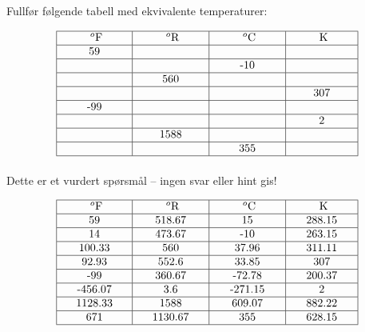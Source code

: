 

Fullfør følgende tabell med ekvivalente temperaturer:


$$\vbox{\offinterlineskip
\halign{\strut
\vrule \quad\hfil # \ \hfil & 
\vrule \quad\hfil # \ \hfil & 
\vrule \quad\hfil # \ \hfil & 
\vrule \quad\hfil # \ \hfil \vrule \cr
\noalign{\hrule}
%
\hskip 20pt $^{o}$F \hskip 20pt & \hskip 20pt $^{o}$R \hskip 20pt & \hskip 20pt $^{o}$C \hskip 20pt & \hskip 20pt K \hskip 20pt \cr
%
\noalign{\hrule}
%
59 &  &  &  \cr
%
\noalign{\hrule}
%
  &  & -10 &  \cr
%
\noalign{\hrule}
%
  & 560 &  &  \cr
%
\noalign{\hrule}
%
  &  &  & 307 \cr
%
\noalign{\hrule}
%
-99  &  &  &  \cr
%
\noalign{\hrule}
%
  &  &  & 2 \cr
%
\noalign{\hrule}
%
  & 1588 &  &  \cr
%
\noalign{\hrule}
%
  &  & 355 &  \cr
%
\noalign{\hrule}
} %
}$$ %

\vfil 

\eject






Dette er et vurdert spørsmål -- ingen svar eller hint gis!








$$\vbox{\offinterlineskip
\halign{\strut
\vrule \quad\hfil # \ \hfil & 
\vrule \quad\hfil # \ \hfil & 
\vrule \quad\hfil # \ \hfil & 
\vrule \quad\hfil # \ \hfil \vrule \cr
\noalign{\hrule}
%
\hskip 20pt $^{o}$F \hskip 20pt & \hskip 20pt $^{o}$R \hskip 20pt & \hskip 20pt $^{o}$C \hskip 20pt & \hskip 20pt K \hskip 20pt \cr
%
\noalign{\hrule}
%
59 & 518.67 & 15 & 288.15 \cr
%
\noalign{\hrule}
%
14  & 473.67 & -10 & 263.15 \cr
%
\noalign{\hrule}
%
100.33  & 560 & 37.96 & 311.11 \cr
%
\noalign{\hrule}
%
92.93  & 552.6 & 33.85 & 307 \cr
%
\noalign{\hrule}
%
-99  & 360.67 & -72.78 & 200.37 \cr
%
\noalign{\hrule}
%
-456.07  & 3.6 & -271.15 & 2 \cr
%
\noalign{\hrule}
%
1128.33 & 1588 & 609.07 & 882.22 \cr
%
\noalign{\hrule}
%
671 & 1130.67 & 355 & 628.15 \cr
%
\noalign{\hrule}
} %
}$$ %


